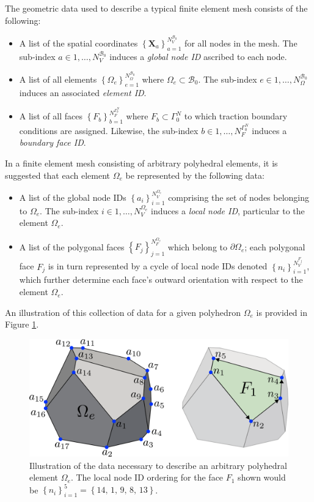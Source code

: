 	The geometric data used to describe a typical finite element mesh consists of the following:
	\begin{itemize}
		\item A list of the spatial coordinates $\left\{ \mathbf{X}_a \right\}_{a=1}^{N^{\mathcal{B}_0}_V}$ for all nodes in the mesh. The sub-index $a \in 1, \ldots, N^{\mathcal{B}_0}_V$ induces a \textit{global node ID} ascribed to each node.
		\item A list of all elements $\left\{ \Omega_{e} \right\}_{e = 1}^{N^{\mathcal{B}_0}_\Omega}$ where $\Omega_{e} \subset \mathcal{B}_0$. The sub-index $e \in 1, \ldots, N^{\mathcal{B}_0}_\Omega$ induces an associated \textit{element ID}.
		\item A list of all faces $\left\{ F_{b} \right\}_{b = 1}^{N^{\Gamma^N_0}_F}$ where $F_{b} \subset \Gamma^N_0$ to which traction boundary conditions are assigned. Likewise, the sub-index $b \in 1, \ldots, N^{\Gamma^N_0}_F$ induces a \textit{boundary face ID}.
	\end{itemize}
	
	In a finite element mesh consisting of arbitrary polyhedral elements, it is suggested that each element $\Omega_e$ be represented by the following data:
	\begin{itemize}
		\item A list of the global node IDs $\left\{ a_i \right\}_{i=1}^{N^{\Omega_e}_V}$ comprising the set of nodes belonging to $\Omega_e$. The sub-index $i \in 1, \ldots, N^{\Omega_e}_V$ induces a \textit{local node ID}, particular to the element $\Omega_e$.
		\item A list of the polygonal faces $\left\{ F_{j} \right\}_{j=1}^{N^{\Omega_e}_F}$ which belong to $\partial \Omega_e$; each polygonal face $F_j$ is in turn represented by a cycle of local node IDs denoted $\left\{ n_i \right\}_{i=1}^{N^{F_j}_V}$, which further determine each face's outward orientation with respect to the element $\Omega_e$.
	\end{itemize}
	An illustration of this collection of data for a given polyhedron $\Omega_e$ is provided in Figure \ref{fig:polyhedron_data}.
	\begin{figure} [!ht]
		\centering
		\includegraphics[width = 6.0in]{figures/polyhedron_data.pdf}
		\caption{Illustration of the data necessary to describe an arbitrary polyhedral element $\Omega_e$. The local node ID ordering for the face $F_1$ shown would be $\left\{ n_i \right\}_{i=1}^{5} = \left\{ 14, \, 1, \, 9, \, 8, \, 13 \right\}$.}
		\label{fig:polyhedron_data}
	\end{figure}
	
